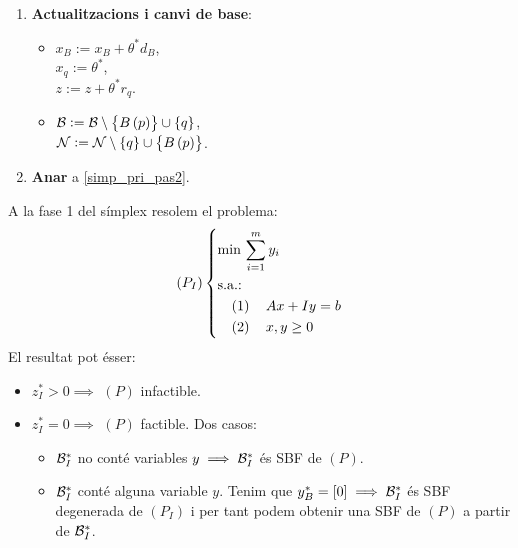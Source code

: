 \begin{alg}
\begin{enumerate}
        \item {\bf Actualitzacions i canvi de base}:
            \begin{itemize}
                \item $x_B := x_B + \theta^*d_B$, \\
                    $x_q := \theta^*$, \\
                    $z := z + \theta^* r_q$.
                \item $\mathcal{B} := \mathcal{B} \setminus \left\{B\left(p\right)\right\} \cup \left\{q\right\}$, \\
                    $\mathcal{N} := \mathcal{N} \setminus \left\{q\right\} \cup \left\{B\left(p\right)\right\}$.
            \end{itemize}
        \item {\bf Anar} a \ref{simp_pri_pas2}.
    \end{enumerate}
\end{alg}
\begin{obs}
    A la fase 1 del símplex resolem el problema:
    \begin{equation*}
        \lp P_I \rp \begin{dcases*}
            \min\, \sum_{i = 1}^m y_i \\
            \text{s.a.: } \\
            \quad \left( 1 \right) \quad Ax + Iy = b \\
            \quad \left( 2 \right) \quad x, y \geq 0 \\
        \end{dcases*}
    \end{equation*}
    El resultat pot ésser:
    \begin{itemize}
        \item $z_I^* > 0 \implies$ $\left(P\right)$ infactible.
        \item $z_I^* = 0 \implies$ $\left(P\right)$ factible. Dos casos:
            \begin{itemize}
                \item $\mathcal{B}_I^*$ no conté variables $y \implies \mathcal{B}_I^*$ és SBF de $\left(P\right)$.
                \item $\mathcal{B}_I^*$ conté alguna variable $y$. Tenim que $y_B^* = \left[0\right] \implies \mathcal{B}_I^*$ és SBF degenerada de $\left(P_I\right)$ i per tant podem obtenir una SBF de $\left(P\right)$ a partir de $\mathcal{B}_I^*$.
            \end{itemize}
    \end{itemize}
\end{obs}
